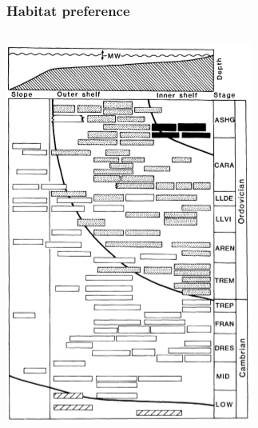\documentclass{beamer}
\begin{document}
\begin{frame}
  \frametitle{Habitat preference}

  \begin{columns}
    \begin{column}{0.5\textwidth}
      \begin{center}
        \includegraphics[height = 0.8\textheight, width = \textwidth, keepaspectratio = true]{figure/onoff}


\end{center}
\end{column}
\end{columns}
\end{frame}
\end{document}
